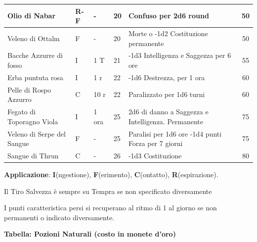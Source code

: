 \begin{tabularx}{1\textwidth}{m{4.8cm}lllm{6.5cm}c}
	\midrule
	Olio di Nabar \index{Olio di Nabar}& R-F& - & 20& Confuso per 2d6 round& 50\\
	\midrule
	Veleno di Ottalm\index{Veleno di Ottalm}& F& - & 20& Morte o -1d2 Costituzione permanente& 50\\
	\midrule
	Bacche Azzurre di fosso \index{Bacche Azzurre di fosso}& I& 1 T& 21& -1d3 Intelligenza e Saggezza per 6 ore& 55\\
	\midrule
	Erba puntuta rosa \index{Erba puntuta rosa}& I& 1 r& 22& -1d6 Destrezza, per 1 ora& 60\\
	\midrule
	Pelle di Rospo Azzurro \index{Pelle di Rospo Azzurro}& C& 10 r & 22& Paralizzato per 1d6 turni& 60\\
	\midrule
	Fegato di Toporagno Viola \index{Fegato di Toporagno Viola} & I& 1 ora& 25& 2d6 di danno a Saggezza e Intelligenza. Permanente & 75 \\
	\midrule
	Veleno di Serpe del Sangue \index{Veleno di Serpe del Sangue} & F& - & 25& Paralisi per 1d6 ore -1d4 punti Forza per 7 giorni & 75\\
	\midrule
	Sangue di Thrun \index{Sangue di Thrun} & C& - & 26& -1d3 Costituzione & 80\\
	\bottomrule
\end{tabularx}

\medskip

\textbf{Applicazione}: \textbf{I}(ngestione), \textbf{F}(erimento), \textbf{C}(ontatto), \textbf{R}(espirazione).

Il Tiro Salvezza è sempre su Tempra se non specificato diversamente

I punti caratteristica persi si recuperano al ritmo di 1 al giorno se non permanenti o indicato diversamente.

\pagebreak

\textbf{Tabella: Pozioni Naturali (costo in monete d'oro)}\label{tabellapozioni}

\medskip


